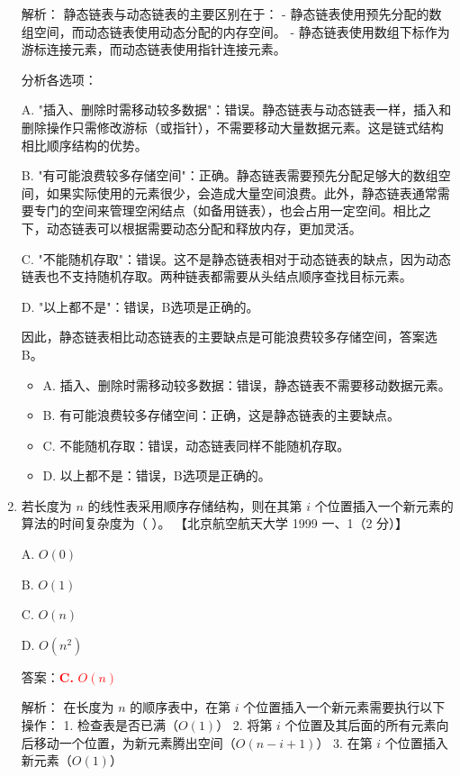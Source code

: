 \documentclass[lang=cn,newtx,10pt,scheme=chinese]{../../../elegantbook}
\begin{document}
\begin{enumerate}
        解析：
        静态链表与动态链表的主要区别在于：
        - 静态链表使用预先分配的数组空间，而动态链表使用动态分配的内存空间。
        - 静态链表使用数组下标作为游标连接元素，而动态链表使用指针连接元素。

        分析各选项：

        A. "插入、删除时需移动较多数据"：错误。静态链表与动态链表一样，插入和删除操作只需修改游标（或指针），不需要移动大量数据元素。这是链式结构相比顺序结构的优势。

        B. "有可能浪费较多存储空间"：正确。静态链表需要预先分配足够大的数组空间，如果实际使用的元素很少，会造成大量空间浪费。此外，静态链表通常需要专门的空间来管理空闲结点（如备用链表），也会占用一定空间。相比之下，动态链表可以根据需要动态分配和释放内存，更加灵活。

        C. "不能随机存取"：错误。这不是静态链表相对于动态链表的缺点，因为动态链表也不支持随机存取。两种链表都需要从头结点顺序查找目标元素。

        D. "以上都不是"：错误，B选项是正确的。

        因此，静态链表相比动态链表的主要缺点是可能浪费较多存储空间，答案选B。

        \begin{itemize}
            \item A. 插入、删除时需移动较多数据：错误，静态链表不需要移动数据元素。
            \item B. 有可能浪费较多存储空间：正确，这是静态链表的主要缺点。
            \item C. 不能随机存取：错误，动态链表同样不能随机存取。
            \item D. 以上都不是：错误，B选项是正确的。
        \end{itemize}
    
        \item 若长度为 $n$ 的线性表采用顺序存储结构，则在其第 $i$ 个位置插入一个新元素的算法的时间复杂度为（ ）。  
        【北京航空航天大学 1999 一、1（2 分）】  
    
        A. $O(0)$  
    
        B. $O(1)$  
    
        C. $O(n)$  
    
        D. $O(n^2)$  

        答案：\textcolor{red}{\textbf{C.} $O(n)$}

        解析：
        在长度为 $n$ 的顺序表中，在第 $i$ 个位置插入一个新元素需要执行以下操作：
        1. 检查表是否已满（$O(1)$）
        2. 将第 $i$ 个位置及其后面的所有元素向后移动一个位置，为新元素腾出空间（$O(n-i+1)$）
        3. 在第 $i$ 个位置插入新元素（$O(1)$）


\end{enumerate}
\end{document}
